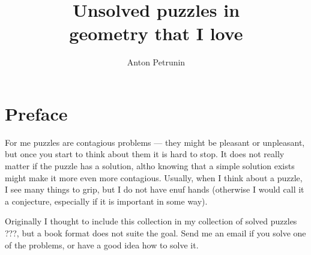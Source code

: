 \documentclass[twoside]{book}
\begin{document}
\title{Unsolved puzzles in\\ 
geometry that I love}
\author{Anton Petrunin}
\date{}
\maketitle



\thispagestyle{empty}
\tableofcontents
\thispagestyle{empty}

\newpage
\thispagestyle{empty}
\section*{Preface}

For me puzzles are contagious problems --- they might be pleasant or unpleasant, but once you start to think about them it is hard to stop.
It does not really matter if the puzzle has a solution, altho knowing that a simple solution exists might make it more even more contagious.
Usually, when I think about a puzzle, I see many things to grip, but I do not have enuf hands (otherwise I would call it a conjecture, especially if it is important in some way).

Originally I thought to include this collection in my collection of solved puzzles ???, but a book format does not suite the goal.
Send me an email if you solve one of the problems, or have a good idea how to solve it.

\vfill






\backmatter
\newpage
{}
{\scriptsize

}
\sloppy
\printbibliography[heading=bibintoc]
\fussy
\end{document}
